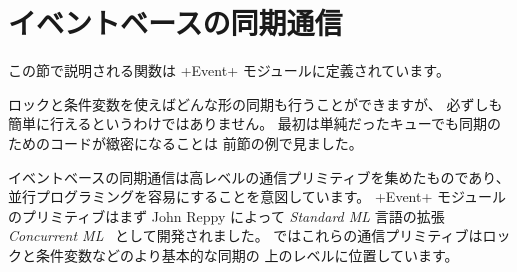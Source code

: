 \section{イベントベースの同期通信}

この節で説明される関数は \ml+Event+ モジュールに定義されています。

ロックと条件変数を使えばどんな形の同期も行うことができますが、
必ずしも簡単に行えるというわけではありません。
最初は単純だったキューでも同期のためのコードが緻密になることは
前節の例で見ました。

イベントベースの同期通信は高レベルの通信プリミティブを集めたものであり、
並行プログラミングを容易にすることを意図しています。
\ml+Event+ モジュールのプリミティブはまず John Reppy によって \emph{Standard ML} 言語の拡張
\emph{Concurrent ML}~\cite{CML} として開発されました。
\ocaml ではこれらの通信プリミティブはロックと条件変数などのより基本的な同期の
上のレベルに位置しています。

